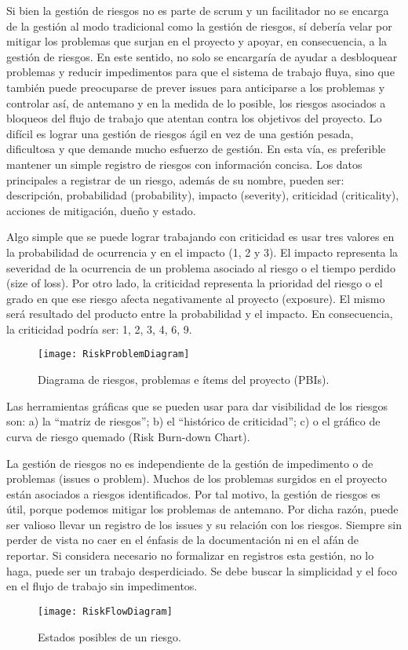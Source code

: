 Si bien la gestión de riesgos no es parte de scrum y un facilitador no se encarga de la gestión al modo tradicional como la gestión de riesgos, sí debería velar por mitigar los problemas que surjan en el proyecto y apoyar, en consecuencia, a la gestión de riesgos. En este sentido, no solo se encargaría de ayudar a desbloquear problemas y reducir impedimentos para que el sistema de trabajo fluya, sino que también puede preocuparse de prever issues para anticiparse a los problemas y controlar así, de antemano y en la medida de lo posible, los riesgos asociados a bloqueos del flujo de trabajo que atentan contra los objetivos del proyecto. Lo difícil es lograr una gestión de riesgos ágil en vez de una gestión pesada, dificultosa y que demande mucho esfuerzo de gestión. En esta vía, es preferible mantener un simple registro de riesgos con información concisa. Los datos principales a registrar de un riesgo, además de su nombre, pueden ser: descripción, probabilidad (probability), impacto (severity), criticidad (criticality), acciones de mitigación, dueño y estado.

Algo simple que se puede lograr trabajando con criticidad es usar tres valores en la probabilidad de ocurrencia y en el impacto (1, 2 y 3). El impacto representa la severidad de la ocurrencia de un problema asociado al riesgo o el tiempo perdido (size of loss). Por otro lado, la criticidad representa la prioridad del riesgo o el grado en que ese riesgo afecta negativamente al proyecto (exposure). El mismo será resultado del producto entre la probabilidad y el impacto. En consecuencia, la criticidad podría ser: 1, 2, 3, 4, 6, 9.

\begin{figure}[h]
  \centering
  \texttt{[image: RiskProblemDiagram]}
  \caption{Diagrama de riesgos, problemas e ítems del proyecto (PBIs).}
  \centering
  \label{fig:RiskProblemDiagram} %
\end{figure}

Las herramientas gráficas que se pueden usar para dar visibilidad de los riesgos son: a) la “matriz de riesgos”; b) el “histórico de criticidad”; c) o el gráfico de curva de riesgo quemado (Risk Burn-down Chart).

La gestión de riesgos no es independiente de la gestión de impedimento o de problemas (issues o problem). Muchos de los problemas surgidos en el proyecto están asociados a riesgos identificados. Por tal motivo, la gestión de riesgos es útil, porque podemos mitigar los problemas de antemano. Por dicha razón, puede ser valioso llevar un registro de los issues y su relación con los riesgos. Siempre sin perder de vista no caer en el énfasis de la documentación ni en el afán de reportar. Si considera necesario no formalizar en registros esta gestión, no lo haga, puede ser un trabajo desperdiciado. Se debe buscar la simplicidad y el foco en el flujo de trabajo sin impedimentos.

\begin{figure}[h]
  \centering
  \texttt{[image: RiskFlowDiagram]}
  \caption{Estados posibles de un riesgo.}
  \centering
  \label{fig:RiskFlowDiagram} %
\end{figure}
